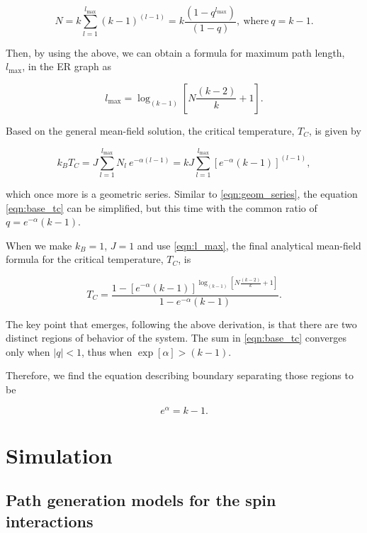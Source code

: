 \documentclass[11pt,a4paper]{article}
\begin{document}
\begin{equation}\label{eqn:geom_series}
    N = k \sum_{l=1}^{l_{\max}} (k-1)^{(l-1)} = k\frac{(1 - q^{l_{\max}})}{(1 - q)},\ \text{where}\ q=k-1.
\end{equation}

Then, by using the above, we can obtain a formula for maximum path length, $l_{\max}$, in the ER graph as

\begin{equation}\label{eqn:l_max}
    l_{\max} = \log_{(k-1)}{\left[N\frac{(k-2)}{k} + 1\right]}.
\end{equation}

Based on the general mean-field solution, the critical temperature, $T_C$, is given by

\begin{equation}\label{eqn:base_tc}
    k_B T_C = J \sum_{l=1}^{l_{\max}} N_l~ e^{-\alpha (l-1)} = kJ \sum_{l=1}^{l_{\max}} \left[e^{-\alpha}(k-1)\right]^{(l-1)},
\end{equation}

which once more is a geometric series. Similar to \eqref{eqn:geom_series}, the equation \eqref{eqn:base_tc} can be simplified, but this time with the common ratio of $q=e^{-\alpha}(k-1)$.

When we make $k_B=1$, $J=1$ and use \eqref{eqn:l_max}, the final analytical mean-field formula for the critical temperature, $T_C$, is

\begin{equation}
    T_C = \frac{1 - [e^{-\alpha}(k-1)]^{\log_{(k-1)}{\left[N\frac{(k-2)}{k} + 1\right]}}}{1 - e^{-\alpha}(k-1)}.
\end{equation}

The key point that emerges, following the above derivation, is that there are two distinct regions of behavior of the system. The sum in \eqref{eqn:base_tc} converges only when $|q|<1$, thus when $\exp[\alpha] > (k-1)$.

Therefore, we find the equation describing boundary separating those regions to be

\begin{equation}
    e^\alpha = k-1.
\end{equation}

\section{Simulation}

\subsection{Path generation models for the spin interactions}
\end{document}
